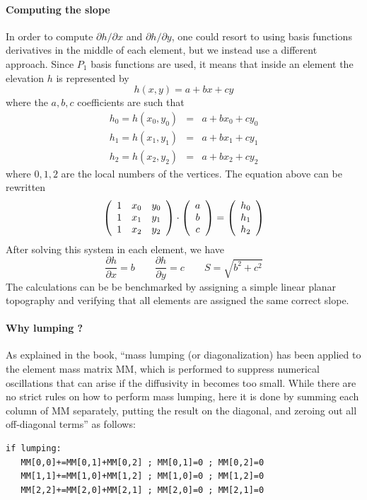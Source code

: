 \paragraph{Computing the slope}

In order to compute $\partial h/\partial x$ and $\partial h/\partial y$, one could resort to using 
basis functions derivatives in the middle of each element, but we
instead use a different approach. 
Since $P_1$ basis functions are used, it means that inside an element 
the elevation $h$ is represented by 
\[
h(x,y)=a+bx+cy
\]
where the $a,b,c$ coefficients are such that 
\begin{eqnarray}
h_0=h(x_0,y_0) &=& a + bx_0 + cy_0 \\
h_1=h(x_1,y_1) &=& a + bx_1 + cy_1 \\
h_2=h(x_2,y_2) &=& a + bx_2 + cy_2
\end{eqnarray} 
where $0,1,2$ are the local numbers of the vertices.
The equation above can be rewritten
\[
\left(
\begin{array}{ccc}
1 & x_0 & y_0 \nonumber\\
1 & x_1 & y_1 \nonumber\\
1 & x_2 & y_2 \\
\end{array}
\right)
\cdot
\left(
\begin{array}{c}
a \\ b \\ c
\end{array}
\right)
=
\left(
\begin{array}{c}
h_0 \\ h_1 \\ h_2
\end{array}
\right)
\]
After solving this system in each element, we have
\[
\frac{\partial h}{\partial x} = b 
\qquad
\frac{\partial h}{\partial y} = c
\qquad
S=\sqrt{b^2+c^2}
\]
The calculations can be be benchmarked by assigning a simple linear planar 
topography and verifying that all elements are assigned the same correct slope.

\paragraph{Why lumping ?}

As explained in the book, ``mass lumping (or diagonalization) has been applied to the element mass matrix MM, which
is performed to suppress numerical oscillations that can arise if the diffusivity in becomes too
small. While there are no strict rules on how to perform mass lumping, here it is done by summing
each column of MM separately, putting the result on the diagonal, and zeroing out all off-diagonal
terms'' as follows:
\begin{lstlisting}
if lumping:
   MM[0,0]+=MM[0,1]+MM[0,2] ; MM[0,1]=0 ; MM[0,2]=0
   MM[1,1]+=MM[1,0]+MM[1,2] ; MM[1,0]=0 ; MM[1,2]=0
   MM[2,2]+=MM[2,0]+MM[2,1] ; MM[2,0]=0 ; MM[2,1]=0
\end{lstlisting}

